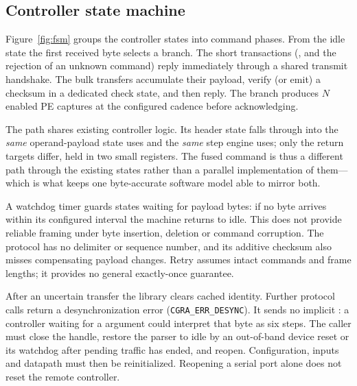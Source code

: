 \subsection{Controller state machine}

Figure~\ref{fig:fsm} groups the controller states into command phases.
From the idle state the first
received byte selects a branch. The short transactions (,  and
the rejection of an unknown command) reply immediately through a shared
transmit handshake. The bulk transfers accumulate their payload, verify (or
emit) a checksum in a dedicated check state, and then reply. The 
branch produces $N$ enabled PE captures at the configured cadence before
acknowledging.

The  path shares existing controller logic. Its header state falls through into
the \emph{same} operand-payload state  uses and the \emph{same} step
engine  uses; only the return targets differ, held in two small
registers. The fused command is thus a different path through the existing
states rather than a parallel implementation of them---which is what keeps one
byte-accurate software model able to mirror both.



A watchdog timer guards states waiting for payload bytes: if no byte arrives
within its configured interval the machine returns to idle. This does not
provide reliable framing under byte insertion, deletion or command corruption.
The protocol has no delimiter or sequence number, and its additive checksum
also misses compensating payload changes. Retry assumes intact commands and
frame lengths; it provides no general exactly-once guarantee.

After an uncertain transfer the library clears cached identity. Further
protocol calls return a desynchronization error
(\texttt{CGRA\_ERR\_DESYNC}). It sends no implicit
: a controller waiting for a  argument could interpret that
byte as six steps. The caller must close the handle, restore the parser to idle
by an out-of-band device reset or its watchdog after pending traffic has ended,
and reopen. Configuration, inputs and datapath must then be reinitialized.
Reopening a serial port alone does not reset the remote controller.
